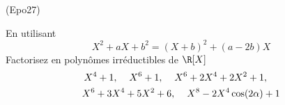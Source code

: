 \begin{tiny}(Epo27)\end{tiny} En utilisant
\begin{displaymath}
 X^2 +aX +b^2 =(X+b)^2 +(a-2b)X
\end{displaymath}
Factorisez en polynômes irréductibles de $\R[X]$
\begin{multline*}
X^4 + 1,\hspace{0.4cm}
 X^6 +1,\hspace{0.4cm}
 X^6+2X^4+2X^2+1 ,\hspace{0.4cm} \\
 X^6+3X^4+5X^2+6 ,\hspace{0.4cm}
 X^8-2X^4\cos(2\alpha)+1
\end{multline*}

  